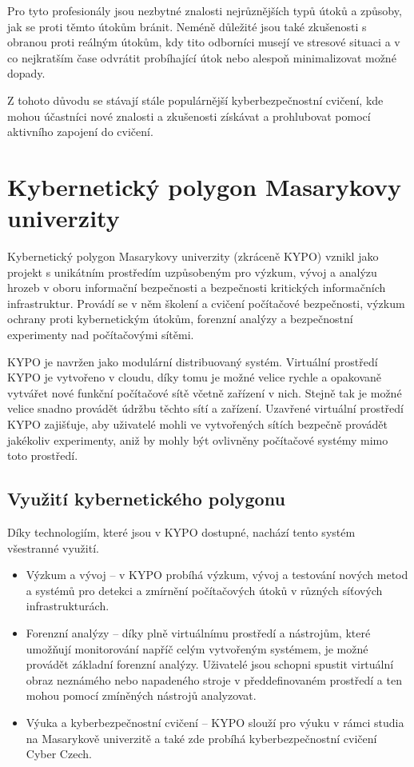 \documentclass[
  digital, %
  twoside, %
  table,   %
  nolof,     %
  nolot,     %
]{fithesis3}
\begin{document}
Pro tyto profesionály jsou nezbytné znalosti nejrůznějších typů útoků a způsoby, jak se proti těmto útokům bránit. Neméně důležité jsou také zkušenosti s obranou proti reálným útokům, kdy tito odborníci musejí ve stresové situaci a v co nejkratším čase odvrátit probíhající útok nebo alespoň minimalizovat možné dopady. 

Z tohoto důvodu se stávají stále populárnější kyberbezpečnostní cvičení, kde mohou účastníci nové znalosti a zkušenosti získávat a prohlubovat pomocí aktivního zapojení do cvičení.

\section{Kybernetický polygon Masarykovy univerzity}

Kybernetický polygon Masarykovy univerzity (zkráceně KYPO) vznikl jako projekt s unikátním prostředím uzpůsobeným pro výzkum, vývoj a analýzu hrozeb v oboru informační bezpečnosti a bezpečnosti kritických informačních infrastruktur. Provádí se v něm školení a cvičení počítačové bezpečnosti, výzkum ochrany proti kybernetickým útokům, forenzní analýzy a bezpečnostní experimenty nad počítačovými sítěmi.

KYPO je navržen jako modulární distribuovaný systém. \cite{Vykopal2017KYPOCases} Virtuální prostředí KYPO je vytvořeno v cloudu, díky tomu je možné velice rychle a opakovaně vytvářet nové funkční počítačové sítě včetně zařízení v nich. Stejně tak je možné velice snadno provádět údržbu těchto sítí a zařízení. Uzavřené virtuální prostředí KYPO zajišťuje, aby uživatelé mohli ve vytvořených sítích bezpečně provádět jakékoliv experimenty, aniž by mohly být ovlivněny počítačové systémy mimo toto prostředí.


\subsection{Využití kybernetického polygonu}
Díky technologiím, které jsou v KYPO dostupné, nachází tento systém všestranné využití. 
\begin{itemize}
\item Výzkum a vývoj -- v KYPO probíhá výzkum, vývoj a testování nových metod a systémů pro detekci a zmírnění počítačových útoků v různých síťových infrastrukturách.
\item Forenzní analýzy -- díky plně virtuálnímu prostředí a nástrojům, které umožňují monitorování napříč celým vytvořeným systémem, je možné provádět základní forenzní analýzy. Uživatelé jsou schopni spustit virtuální obraz neznámého nebo napadeného stroje v předdefinovaném prostředí a ten mohou pomocí zmíněných nástrojů analyzovat. 
\item Výuka a kyberbezpečnostní cvičení -- KYPO slouží pro výuku v rámci studia na Masarykově univerzitě a také zde probíhá kyberbezpečnostní cvičení Cyber Czech.
\end{itemize}
\end{document}
